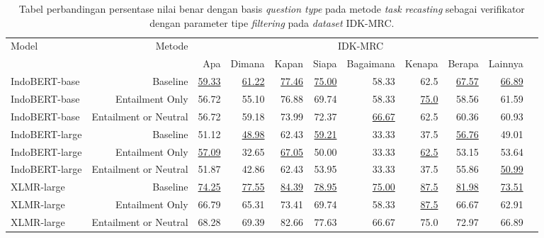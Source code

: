 \begin{table}[H]\centering
\scriptsize
\begin{tabular}{lrrrrrrrrrr}\toprule
\multirow{2}{*}{Model} &\multirow{2}{*}{Metode} &\multicolumn{8}{c}{IDK-MRC} \\\cmidrule{3-10}
& &Apa &Dimana &Kapan &Siapa &Bagaimana &Kenapa &Berapa &Lainnya \\\midrule
IndoBERT-base &Baseline &\underline{59.33} &\underline{61.22} &\underline{77.46} &\underline{75.00} &58.33 &62.5 &\underline{67.57} &\underline{66.89} \\
IndoBERT-base &Entailment Only &56.72 &55.10 &76.88 &69.74 &58.33 &\underline{75.0} &58.56 &61.59 \\
IndoBERT-base &Entailment or Neutral &56.72 &59.18 &73.99 &72.37 &\underline{66.67} &62.5 &60.36 &60.93 \\
\hline
IndoBERT-large &Baseline &51.12 &\underline{48.98} &62.43 &\underline{59.21} &33.33 &37.5 &\underline{56.76} &49.01 \\
IndoBERT-large &Entailment Only &\underline{57.09} &32.65 &\underline{67.05} &50.00 &33.33 &\underline{62.5} &53.15 &53.64 \\
IndoBERT-large &Entailment or Neutral &51.87 &42.86 &62.43 &53.95 &33.33 &37.5 &55.86 &\underline{50.99} \\
\hline
XLMR-large &Baseline &\underline{74.25} &\underline{77.55} &\underline{84.39} &\underline{78.95} &\underline{75.00} &\underline{87.5} &\underline{81.98} &\underline{73.51} \\
XLMR-large &Entailment Only &66.79 &65.31 &73.41 &69.74 &58.33 &\underline{87.5} &66.67 &62.91 \\
XLMR-large &Entailment or Neutral &68.28 &69.39 &82.66 &77.63 &66.67 &75.0 &72.97 &66.89 \\
\bottomrule
\end{tabular}
\caption{Tabel perbandingan persentase nilai benar dengan basis \emph{question type} pada metode \emph{task recasting} sebagai verifikator dengan parameter tipe \emph{filtering} pada \emph{dataset} IDK-MRC.}
\end{table}


